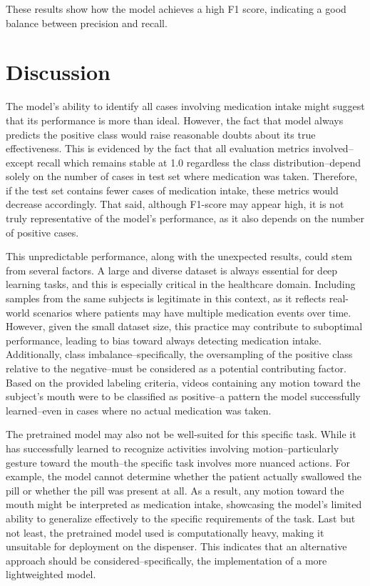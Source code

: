 \documentclass[a4paper,12pt]{article}
\begin{document}
These results show how the model achieves a high F1 score, indicating a good balance between precision and recall. 

\section{Discussion}
The model's ability to identify all cases involving medication intake might suggest that its performance is more than ideal. 
However, the fact that model always predicts the positive class would raise reasonable doubts about its true effectiveness. 
This is evidenced by the fact that all evaluation metrics involved--except recall which remains stable at 1.0 regardless the
 class distribution--depend solely on the number of cases in test set where medication was taken. Therefore, if the test set 
 contains fewer cases of medication intake, these metrics would decrease accordingly. That said, although F1-score may appear high, 
 it is not truly representative of the model's performance, as it also depends on the number of positive cases.

This unpredictable performance, along with the unexpected results, could stem from several factors. A large and diverse
 dataset is always essential for deep learning tasks, and this is especially critical in the healthcare domain. Including 
 samples from the same subjects is legitimate in this context, as it reflects real-world scenarios where patients may have 
 multiple medication events over time. However, given the small dataset size, this practice may contribute to suboptimal 
 performance, leading to bias toward always detecting medication intake. Additionally, class imbalance--specifically, the 
 oversampling of the positive class relative to the negative--must be considered as a potential contributing factor. Based 
 on the provided labeling criteria, videos containing any motion toward the subject's mouth were to be classified as 
 positive--a pattern the model successfully learned--even in cases where no actual medication was taken. 

The pretrained model may also not be well-suited for this specific task. While it has successfully learned to recognize 
activities involving motion--particularly gesture toward the mouth--the specific task involves more nuanced actions. For 
example, the model cannot determine whether the patient actually swallowed the pill or whether the pill was present at all. 
As a result, any motion toward the mouth might be interpreted as medication intake, showcasing the model's limited ability 
to generalize effectively to the specific requirements of the task. Last but not least, the pretrained model used is 
computationally heavy, making it unsuitable for deployment on the dispenser. This indicates that an alternative approach 
should be considered--specifically, the implementation of a more lightweighted model.
\end{document}
